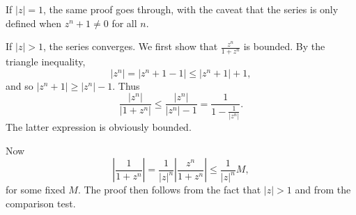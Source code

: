 \documentclass{article}
\begin{document}
\begin{enumerate}[label=\textbf{\arabic*.}]
\begin{enumerate}
If $|z| = 1$, the same proof goes through, with the caveat that the series is only defined when $z^n + 1 \neq 0$ for all $n$.

If $|z| > 1$, the series converges. We first show that $\frac{z^n}{1+z^n}$ is bounded. By the triangle inequality, \[|z^n| = |z^n + 1 - 1| \leq |z^n + 1| + 1,\] and so $|z^n + 1| \geq |z^n| - 1$. Thus \[\frac{|z^n|}{|1+z^n|} \leq \frac{|z^n|}{|z^n| - 1} = \frac{1}{1 - \frac{1}{|z^n|}}.\] The latter expression is obviously bounded.

Now \[\left|\frac{1}{1+z^n}\right| = \frac{1}{|z|^n}\left|\frac{z^n}{1+z^n}\right| \leq \frac{1}{|z|^n} M,\] for some fixed $M$. The proof then follows from the fact that $|z| > 1$ and from the comparison test.
\end{enumerate}
\end{enumerate}
\end{document}
